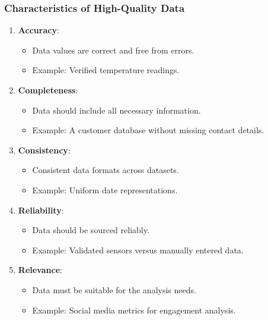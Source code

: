 \documentclass[aspectratio=169]{beamer}
\begin{document}
\begin{frame}[fragile]
    \frametitle{Characteristics of High-Quality Data}
    \begin{enumerate}
        \item \textbf{Accuracy}:
            \begin{itemize}
                \item Data values are correct and free from errors.
                \item Example: Verified temperature readings.
            \end{itemize}
        \item \textbf{Completeness}:
            \begin{itemize}
                \item Data should include all necessary information.
                \item Example: A customer database without missing contact details.
            \end{itemize}
        \item \textbf{Consistency}:
            \begin{itemize}
                \item Consistent data formats across datasets.
                \item Example: Uniform date representations.
            \end{itemize}
        \item \textbf{Reliability}:
            \begin{itemize}
                \item Data should be sourced reliably.
                \item Example: Validated sensors versus manually entered data.
            \end{itemize}
        \item \textbf{Relevance}:
            \begin{itemize}
                \item Data must be suitable for the analysis needs.
                \item Example: Social media metrics for engagement analysis.
            \end{itemize}
    \end{enumerate}
\end{frame}
\end{document}
